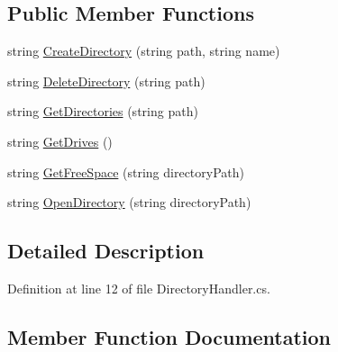 \subsection*{Public Member Functions}
\begin{DoxyCompactItemize}
\item 
string \mbox{\hyperlink{interface_little_weeb_library_1_1_handlers_1_1_i_directory_handler_aa2298db37f9e9a6050d01be4d3150889}{Create\+Directory}} (string path, string name)
\item 
string \mbox{\hyperlink{interface_little_weeb_library_1_1_handlers_1_1_i_directory_handler_a7fcae4cc311e09d32b84327b74d80828}{Delete\+Directory}} (string path)
\item 
string \mbox{\hyperlink{interface_little_weeb_library_1_1_handlers_1_1_i_directory_handler_a4db23041b31d9b7e46c0be7acb27b0a8}{Get\+Directories}} (string path)
\item 
string \mbox{\hyperlink{interface_little_weeb_library_1_1_handlers_1_1_i_directory_handler_ac0cc258a8bef2c9956638e14ad7d1e63}{Get\+Drives}} ()
\item 
string \mbox{\hyperlink{interface_little_weeb_library_1_1_handlers_1_1_i_directory_handler_aa969b0771c2482aa5b3fed0d5b9fae65}{Get\+Free\+Space}} (string directory\+Path)
\item 
string \mbox{\hyperlink{interface_little_weeb_library_1_1_handlers_1_1_i_directory_handler_a43ca9f14498ef3b9cfbdf960b877ac19}{Open\+Directory}} (string directory\+Path)
\end{DoxyCompactItemize}


\subsection{Detailed Description}


Definition at line 12 of file Directory\+Handler.\+cs.



\subsection{Member Function Documentation}
\mbox{\label{interface_little_weeb_library_1_1_handlers_1_1_i_directory_handler_ac0cc258a8bef2c9956638e14ad7d1e63}} 
